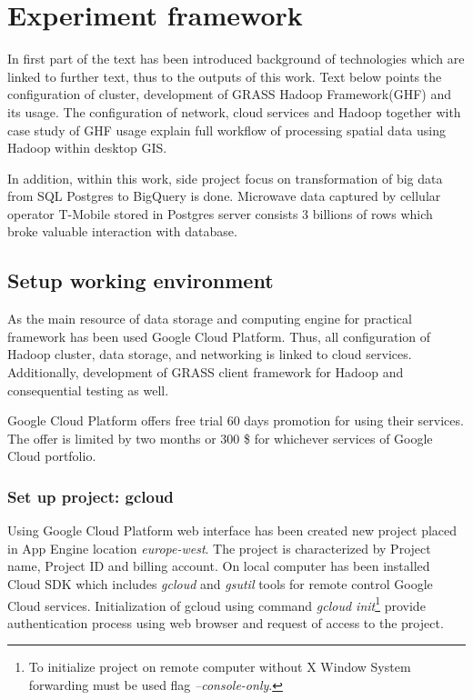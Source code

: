 \documentclass[a4paper,12pt,oneside]{report}
\begin{document}
	
	
	\newpage
	\chapter*{Experiment
		framework}
	In first part of the text has been introduced background of technologies which are 
	linked to further text, thus to the outputs  of this work. Text below points the 
	configuration of cluster, development of GRASS Hadoop Framework(GHF) and its usage.
	The configuration of network, cloud services and Hadoop together with case study of 
	GHF usage explain full workflow of processing spatial data using Hadoop within desktop GIS.
	
	In addition, within this work, side project focus on transformation of big data from SQL
	Postgres to BigQuery is done. Microwave data captured by cellular operator T-Mobile 
	stored in Postgres server	consists 3 billions of rows which 
	broke valuable interaction with database.
	
	
	\section{Setup working environment}\label{setup_w_e}
	As the main resource of data storage and computing engine for practical
	framework has been used Google Cloud Platform. Thus, all configuration of Hadoop 
	cluster, data storage, and networking is linked to cloud services. Additionally,
	development of GRASS client framework for Hadoop and consequential testing  as
	well.
	
	Google Cloud Platform offers free trial 60 days promotion for using their
	services. The offer is limited by two months or 300 \$ for whichever services
	of Google Cloud portfolio.
	
	\subsection{Set up project: gcloud}
	Using Google Cloud Platform web interface has been created new project placed in
	App Engine location \textit{europe-west}. The project is characterized by Project name,
	Project ID and billing account.	On local computer has been installed Cloud SDK 
	which includes \textit{gcloud} 	and \textit{gsutil} tools for remote control Google Cloud services.
	Initialization of gcloud using command \emph{gcloud init}\footnote{To initialize
	project on remote computer 	without X Window System forwarding must be used flag 
	\emph{--console-only}.}	provide authentication process using web browser 
	and request of access to the project.
	
\end{document}
